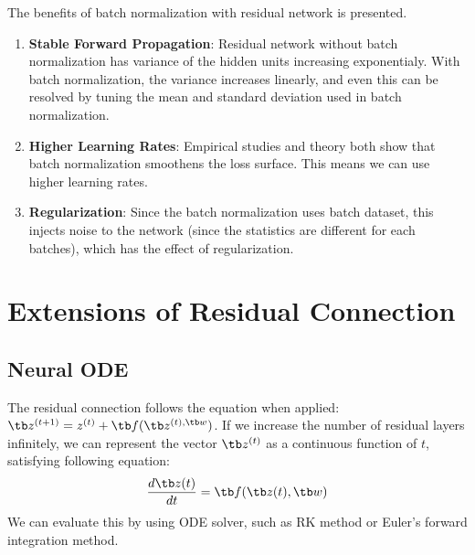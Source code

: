 \documentclass{article}
\begin{document}
        The benefits of batch normalization with residual network is presented.
        \begin{enumerate}
            \item \textbf{Stable Forward Propagation}: Residual network without batch normalization has variance of the hidden units
                increasing exponentialy. With batch normalization, the variance increases linearly, and even this can be resolved
                by tuning the mean and standard deviation used in batch normalization.
            \item \textbf{Higher Learning Rates}: Empirical studies and theory both show that batch normalization
                smoothens the loss surface. This means we can use higher learning rates.
            \item \textbf{Regularization}: Since the batch normalization uses batch dataset, this injects noise to the network
                (since the statistics are different for each batches),
                which has the effect of regularization.
        \end{enumerate}

\section{Extensions of Residual Connection}
    \subsection{Neural ODE}
        The residual connection follows the equation when applied: $\tb z^{(t + 1)} = z^{(t)} + \tb f(\tb z^{(t), \tb w})$.
        If we increase the number of residual layers infinitely, we can represent the vector $\tb z^{(t)}$ as a continuous function of $t$,
        satisfying following equation:
        \[
        \frac{d\tb z(t)}{dt} = \tb f(\tb z(t),\tb w)
        \]
        We can evaluate this by using ODE solver, such as RK method or Euler's forward integration method.
\end{document}
